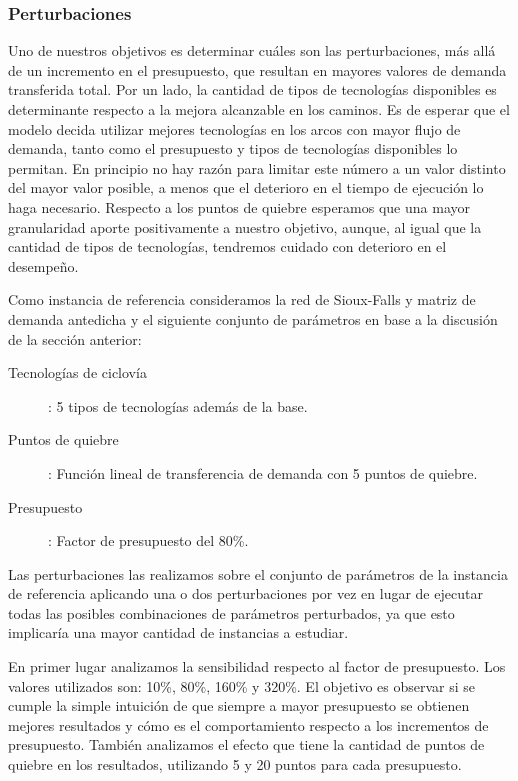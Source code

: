 \documentclass{article}
\begin{document}
  \FloatBarrier
  \subsubsection{Perturbaciones}

  Uno de nuestros objetivos es determinar cuáles son las perturbaciones, más allá de un incremento en el presupuesto, que resultan en mayores valores de demanda transferida total. Por un lado, la cantidad de tipos de tecnologías disponibles es determinante respecto a la mejora alcanzable en los caminos. Es de esperar que el modelo decida utilizar mejores tecnologías en los arcos con mayor flujo de demanda, tanto como el presupuesto y tipos de tecnologías disponibles lo permitan. En principio no hay razón para limitar este número a un valor distinto del mayor valor posible, a menos que el deterioro en el tiempo de ejecución lo haga necesario. Respecto a los puntos de quiebre esperamos que una mayor granularidad aporte positivamente a nuestro objetivo, aunque, al igual que la cantidad de tipos de tecnologías, tendremos cuidado con deterioro en el desempeño.

  Como instancia de referencia consideramos la red de Sioux-Falls y matriz de demanda antedicha y el siguiente conjunto de parámetros en base a la discusión de la sección anterior:

  \begin{description}
    \item[Tecnologías de ciclovía]: 5 tipos de tecnologías además de la base.
    \item[Puntos de quiebre]: Función lineal de transferencia de demanda con 5 puntos de quiebre.
    \item[Presupuesto]: Factor de presupuesto del 80\%.
  \end{description}

  Las perturbaciones las realizamos sobre el conjunto de parámetros de la instancia de referencia aplicando una o dos perturbaciones por vez en lugar de ejecutar todas las posibles combinaciones de parámetros perturbados, ya que esto implicaría una mayor cantidad de instancias a estudiar.

  En primer lugar analizamos la sensibilidad respecto al factor de presupuesto. Los valores utilizados son: 10\%, 80\%, 160\% y 320\%. El objetivo es observar si se cumple la simple intuición de que siempre a mayor presupuesto se obtienen mejores resultados y cómo es el comportamiento respecto a los incrementos de presupuesto. También analizamos el efecto que tiene la cantidad de puntos de quiebre en los resultados, utilizando 5 y 20 puntos para cada presupuesto.
\end{document}
